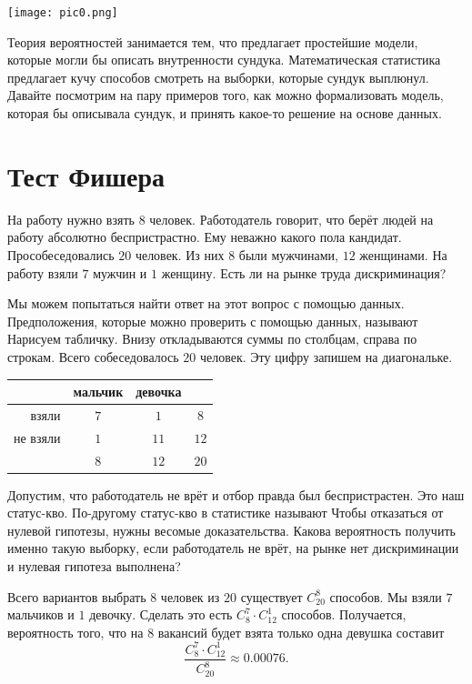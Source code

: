 \documentclass[12pt, a4paper, oneside]{article}
\begin{document}
\begin{center} 
\texttt{[image: pic0.png]}
\end{center} 

Теория вероятностей занимается тем, что предлагает простейшие модели, которые могли бы описать внутренности сундука. Математическая статистика предлагает кучу способов смотреть на выборки, которые сундук выплюнул. Давайте посмотрим на пару примеров того, как можно формализовать модель, которая бы описывала сундук, и принять какое-то решение на основе данных.

\section{Тест Фишера}

На работу нужно взять $8$ человек. Работодатель говорит, что берёт людей на работу абсолютно беспристрастно. Ему неважно какого пола кандидат. Прособеседовались $20$ человек. Из них $8$ были мужчинами, $12$ женщинами. На работу взяли $7$ мужчин и $1$ женщину. Есть ли на рынке труда дискриминация?  

Мы можем попытаться найти ответ на этот вопрос с помощью данных. Предположения, которые можно проверить с помощью данных, называют  Нарисуем табличку. Внизу откладываются суммы по столбцам, справа по строкам. Всего собеседовалось $20$ человек. Эту цифру запишем на диагональке. 

\begin{center}
    \begin{tabular}{|r|c|c|c|}
    \hline
                  & мальчик & девочка &        \\ \hline 
         взяли    &   $7$   &   $1$   & $8$    \\ \hline 
         не взяли &   $1$   &   $11$  & $12$   \\ \hline 
                  &   $8$   &   $12$  & $20$   \\ \hline
    \end{tabular}
\end{center}

Допустим, что работодатель не врёт и отбор правда был беспристрастен. Это наш статус-кво. По-другому статус-кво в статистике называют  Чтобы отказаться от нулевой гипотезы, нужны весомые доказательства. Какова вероятность получить именно такую выборку, если работодатель не врёт, на рынке нет дискриминации и нулевая гипотеза выполнена?

Всего вариантов выбрать $8$ человек из $20$ существует $C_{20}^8$ способов. Мы взяли $7$ мальчиков и $1$ девочку. Сделать это есть $C_8^7 \cdot C_{12}^1$ способов. Получается, вероятность того, что на $8$ вакансий будет взята только одна девушка составит \[ \frac{C_8^7 \cdot C_{12}^1}{C_{20}^8} \approx 0.00076. \] 
\end{document}
